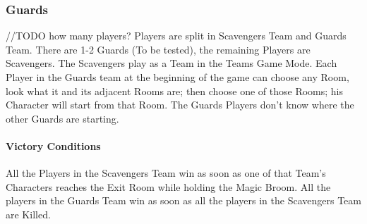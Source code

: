 \subsubsection{Guards} //TODO how many players?
Players are split in Scavengers Team and Guards Team. There are 1-2 Guards (To be tested), the remaining Players are Scavengers.
The Scavengers play as a Team in the Teams Game Mode.
Each Player in the Guards team at the beginning of the game can choose any Room, look what it and its adjacent Rooms are; then choose one of those Rooms; his Character will start from that Room. The Guards Players don't know where the other Guards are starting.
\paragraph{Victory Conditions} All the Players in the Scavengers Team win as soon as one of that Team's Characters reaches the Exit Room while holding the Magic Broom. All the players in the Guards Team win as soon as all the players in the Scavengers Team are Killed.
